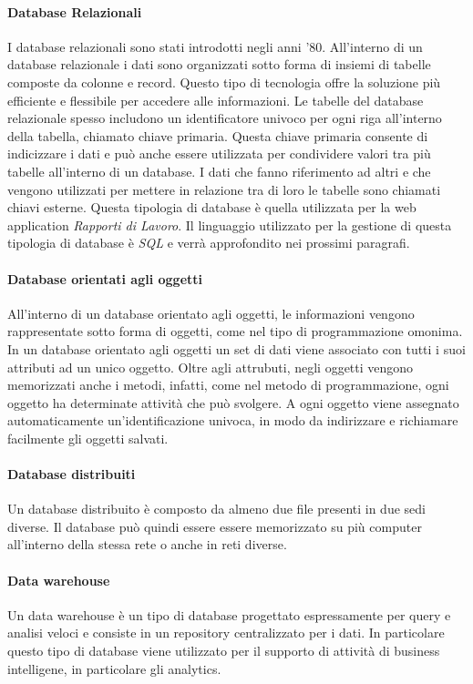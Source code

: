   \paragraph{Database Relazionali}
  I database relazionali sono stati introdotti negli anni '80. All'interno di un database relazionale i dati sono organizzati
  sotto forma di insiemi di tabelle composte da colonne e record. Questo tipo di tecnologia offre la soluzione più
  efficiente e flessibile per accedere alle informazioni. Le tabelle del database relazionale spesso includono un
  identificatore univoco per ogni riga all'interno della tabella, chiamato chiave primaria. Questa chiave primaria consente
  di indicizzare i dati e può anche essere utilizzata per condividere valori tra più tabelle all'interno di un database. I dati
  che fanno riferimento ad altri e che vengono utilizzati per mettere in relazione tra di loro le tabelle sono chiamati chiavi
  esterne. Questa tipologia di database è quella utilizzata per la web application \textit{Rapporti di Lavoro}. Il linguaggio
  utilizzato per la gestione di questa tipologia di database è \textit{SQL} e verrà approfondito nei prossimi paragrafi.
  \paragraph{Database orientati agli oggetti}
  All'interno di un database orientato agli oggetti, le informazioni vengono rappresentate sotto forma di oggetti,
  come nel tipo di programmazione omonima. In un database orientato agli oggetti un set di dati viene associato con tutti 
  i suoi attributi ad un unico oggetto. Oltre agli attrubuti, negli oggetti vengono memorizzati anche i metodi, infatti, 
  come nel metodo di programmazione, ogni oggetto ha determinate attività che può svolgere. A ogni oggetto viene 
  assegnato automaticamente un'identificazione univoca, in modo da indirizzare e richiamare facilmente gli oggetti salvati.
  \paragraph{Database distribuiti}
  Un database distribuito è composto da almeno due file presenti in due sedi diverse. Il database 
  può quindi essere essere memorizzato su più computer all'interno della stessa rete o anche in reti diverse.
  \paragraph{Data warehouse}
  Un data warehouse è un tipo di database progettato espressamente per query e analisi veloci e consiste in un
  repository centralizzato per i dati. In particolare questo tipo di database viene utilizzato per il supporto di 
  attività di business intelligene, in particolare gli analytics.
